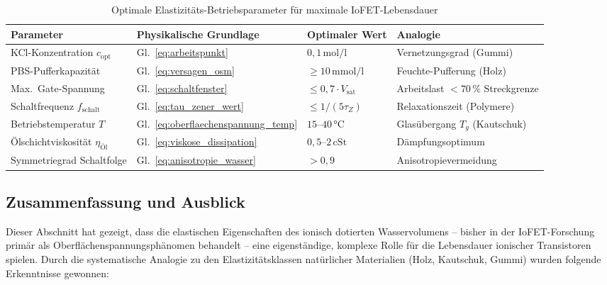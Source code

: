﻿\documentclass[a4paper,12pt]{scrreprt}
\theoremstyle{definition}
\begin{document}
\begin{table}[H]
	\centering
	\caption{Optimale Elastizitäts-Betriebsparameter für maximale IoFET-Lebensdauer}
	\label{tab:optimale_parameter}
	\begin{tabular}{p{4.5cm}p{3.5cm}p{2.8cm}p{3cm}}
		\toprule
		\textbf{Parameter} & \textbf{Physikalische Grundlage} & \textbf{Optimaler Wert} & \textbf{Analogie} \\
		\midrule
		KCl-Konzentration $c_{\mathrm{opt}}$ & Gl.~\eqref{eq:arbeitspunkt} & $0{,}1\,\mathrm{mol/l}$ & Vernetzungsgrad (Gummi) \\
		PBS-Pufferkapazität & Gl.~\eqref{eq:versagen_osm} & $\geq 10\,\mathrm{mmol/l}$ & Feuchte-Pufferung (Holz) \\
		Max.\ Gate-Spannung & Gl.~\eqref{eq:schaltfenster} & $\leq 0{,}7 \cdot V_{\mathrm{sat}}$ & Arbeitslast $< 70\,\%$ Streckgrenze \\
		Schaltfrequenz $f_{\mathrm{schalt}}$ & Gl.~\eqref{eq:tau_zener_wert} & $\leq 1/(5\tau_Z)$ & Relaxationszeit (Polymere) \\
		Betriebstemperatur $T$ & Gl.~\eqref{eq:oberflaechenspannung_temp} & $15$--$40\, °\mathrm{C}$ & Glasübergang $T_g$ (Kautschuk) \\
		Ölschichtviskosität $\eta_{\mathrm{Öl}}$ & Gl.~\eqref{eq:viskose_dissipation} & $0{,}5$--$2\,\mathrm{cSt}$ & Dämpfungs\-optimum \\
		Symmetriegrad Schaltfolge & Gl.~\eqref{eq:anisotropie_wasser} & $> 0{,}9$ & Anisotropievermei\-dung \\
		\bottomrule
	\end{tabular}
\end{table}

\subsection{Zusammenfassung und Ausblick}

Dieser Abschnitt hat gezeigt, dass die elastischen Eigenschaften des
ionisch dotierten Wasservolumens -- bisher in der IoFET-Forschung primär
als Oberflächenspannungsphänomen behandelt -- eine eigenständige,
komplexe Rolle für die Lebensdauer ionischer Transistoren spielen.
Durch die systematische Analogie zu den Elastizitätsklassen natürlicher
Materialien (Holz, Kautschuk, Gummi) wurden folgende Erkenntnisse gewonnen:
\end{document}
